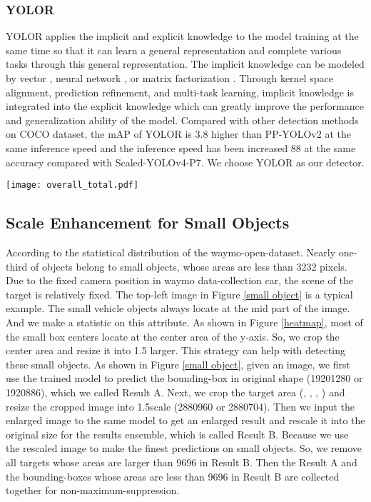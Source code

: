 \documentclass[final]{cvpr}
\begin{document}
\subsubsection{YOLOR}
YOLOR applies the implicit and explicit knowledge to the model training at the same time so that it can learn a general representation and complete various tasks through this general representation. The implicit knowledge can be modeled by vector , neural network , or matrix factorization . Through kernel space alignment, prediction refinement, and multi-task learning, implicit knowledge is integrated into the explicit knowledge which can greatly improve the performance and generalization ability of the model. Compared with other detection methods on COCO dataset, the mAP of YOLOR is 3.8 higher than PP-YOLOv2\cite{huang2021pp} at the same inference speed and the inference speed has been increased 88 at the same accuracy compared with Scaled-YOLOv4-P7\cite{wang2020scaled}. We choose YOLOR as our detector.



\begin{figure*}[t]
    \centering
    \texttt{[image: overall\_total.pdf]}
    \caption{The pipeline of our solution.}
    \label{small object}
\end{figure*}
\subsection{Scale Enhancement for Small Objects}
\label{CRE}
According to the statistical distribution of the waymo-open-dataset. Nearly one-third of objects belong to small objects, whose areas are less than 3232 pixels. Due to the fixed camera position in waymo data-collection car, the scene of the target is relatively fixed. The top-left image in Figure \ref{small object} is a typical example. The small vehicle objects always locate at the mid part of the image. And we make a statistic on this attribute. As shown in Figure \ref{heatmap}, most of the small box centers locate at the center area of the y-axis. So, we crop the center area and resize it into 1.5 larger. This strategy can help with detecting these small objects. As shown in Figure \ref{small object}, given an image, we first use the trained model to predict the bounding-box in original shape (19201280 or 1920886), which we called Result A. Next, we crop the target area (, , , ) and resize the cropped image into 1.5scale (2880960 or 2880704). Then we input the enlarged image to the same model to get an enlarged result and rescale it into the original size for the results ensemble, which is called Result B. Because we use the rescaled image to make the finest predictions on small objects. So, we remove all targets whose areas are larger than 9696 in Result B. Then the Result A and the bounding-boxes whose areas are less than 9696 in Result B are collected together for non-maximum-suppression. 
\end{document}
